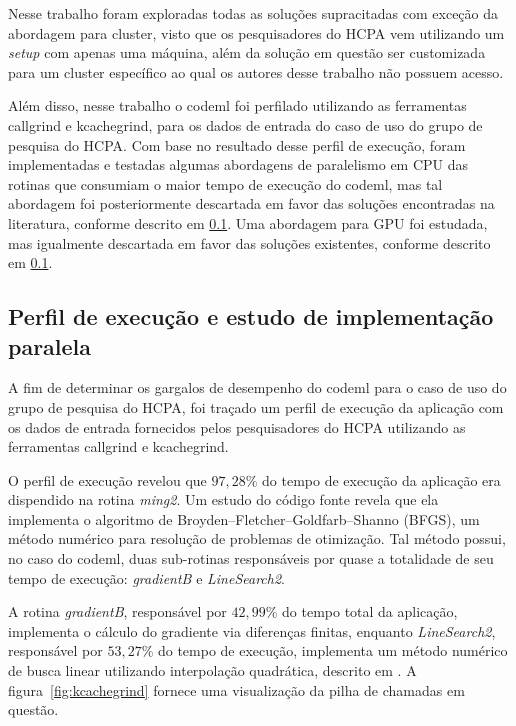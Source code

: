 \documentclass[cic,tc]{iiufrgs}
\begin{document}
Nesse trabalho foram exploradas todas as soluções supracitadas com exceção da
abordagem para cluster, visto que os pesquisadores do HCPA vem
utilizando um \textit{setup} com apenas uma máquina, além da solução em
questão ser customizada para um cluster específico ao qual os autores
desse trabalho não possuem acesso.

Além disso, nesse trabalho o codeml foi perfilado utilizando as ferramentas
callgrind e kcachegrind,\cite{weidendorfer2008sequential} para os dados
de entrada do caso de uso do grupo de pesquisa do HCPA. Com base no
resultado desse perfil de execução, foram implementadas e testadas
algumas abordagens de paralelismo em CPU das rotinas que consumiam o
maior tempo de execução do codeml, mas tal abordagem foi posteriormente
descartada em favor das soluções encontradas na literatura, conforme
descrito em \ref{subsec:codemlpar}. Uma abordagem para GPU foi estudada, mas igualmente
descartada em favor das soluções existentes, conforme descrito em \ref{subsec:codemlpar}.

\subsection{Perfil de execução e estudo de implementação paralela}
\label{subsec:codemlpar}

A fim de determinar os gargalos de desempenho do codeml para o caso de uso do
grupo de pesquisa do HCPA, foi traçado um perfil de execução da aplicação com
os dados de entrada fornecidos pelos pesquisadores do HCPA utilizando as
ferramentas callgrind e kcachegrind.\cite{weidendorfer2008sequential}

O perfil de execução revelou que $97,28\%$ do tempo de execução da aplicação
era dispendido na rotina \textit{ming2}. Um estudo do código fonte revela
que ela implementa o algoritmo de Broyden–Fletcher–Goldfarb–Shanno (BFGS), um
método numérico para resolução de problemas de otimização. Tal método possui,
no caso do codeml, duas sub-rotinas responsáveis por quase a totalidade de seu
tempo de execução: \textit{gradientB} e \textit{LineSearch2}.

A rotina \textit{gradientB}, responsável por $42,99\%$ do tempo total da
aplicação, implementa o cálculo do gradiente via diferenças finitas, enquanto
\textit{LineSearch2}, responsável por $53,27\%$ do tempo de execução,
implementa um método numérico de busca linear utilizando interpolação
quadrática, descrito em \cite{wolfe1978numerical}. A
figura~\ref{fig:kcachegrind} fornece uma visualização da pilha de chamadas em
questão.
\end{document}
